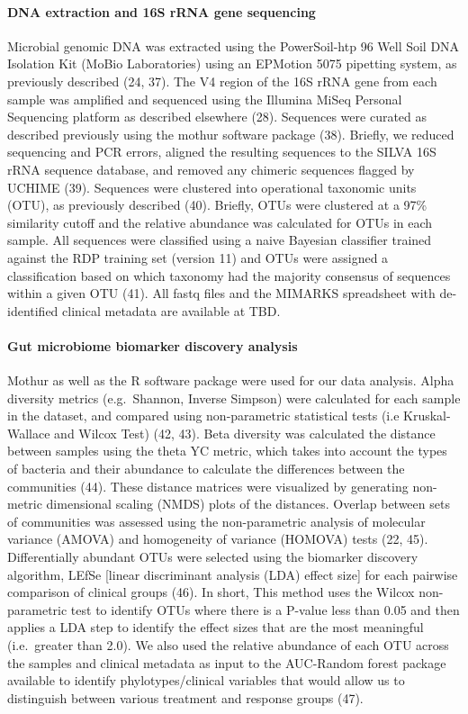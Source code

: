 \documentclass[11pt,]{article}
\let\oldparagraph\paragraph
\renewcommand{\paragraph}[1]{\oldparagraph{#1}\mbox{}}
\begin{document}
\paragraph{DNA extraction and 16S rRNA gene
sequencing}\label{dna-extraction-and-16s-rrna-gene-sequencing}

Microbial genomic DNA was extracted using the PowerSoil-htp 96 Well Soil
DNA Isolation Kit (MoBio Laboratories) using an EPMotion 5075 pipetting
system, as previously described (24, 37). The V4 region of the 16S rRNA
gene from each sample was amplified and sequenced using the Illumina
MiSeq Personal Sequencing platform as described elsewhere (28).
Sequences were curated as described previously using the mothur software
package (38). Briefly, we reduced sequencing and PCR errors, aligned the
resulting sequences to the SILVA 16S rRNA sequence database, and removed
any chimeric sequences flagged by UCHIME (39). Sequences were clustered
into operational taxonomic units (OTU), as previously described (40).
Briefly, OTUs were clustered at a 97\% similarity cutoff and the
relative abundance was calculated for OTUs in each sample. All sequences
were classified using a naive Bayesian classifier trained against the
RDP training set (version 11) and OTUs were assigned a classification
based on which taxonomy had the majority consensus of sequences within a
given OTU (41). All fastq files and the MIMARKS spreadsheet with
de-identified clinical metadata are available at TBD.

\paragraph{Gut microbiome biomarker discovery
analysis}\label{gut-microbiome-biomarker-discovery-analysis}

Mothur as well as the R software package were used for our data
analysis. Alpha diversity metrics (e.g.~Shannon, Inverse Simpson) were
calculated for each sample in the dataset, and compared using
non-parametric statistical tests (i.e Kruskal-Wallace and Wilcox Test)
(42, 43). Beta diversity was calculated the distance between samples
using the theta YC metric, which takes into account the types of
bacteria and their abundance to calculate the differences between the
communities (44). These distance matrices were visualized by generating
non-metric dimensional scaling (NMDS) plots of the distances. Overlap
between sets of communities was assessed using the non-parametric
analysis of molecular variance (AMOVA) and homogeneity of variance
(HOMOVA) tests (22, 45). Differentially abundant OTUs were selected
using the biomarker discovery algorithm, LEfSe {[}linear discriminant
analysis (LDA) effect size{]} for each pairwise comparison of clinical
groups (46). In short, This method uses the Wilcox non-parametric test
to identify OTUs where there is a P-value less than 0.05 and then
applies a LDA step to identify the effect sizes that are the most
meaningful (i.e.~greater than 2.0). We also used the relative abundance
of each OTU across the samples and clinical metadata as input to the
AUC-Random forest package available to identify phylotypes/clinical
variables that would allow us to distinguish between various treatment
and response groups (47).
\end{document}
